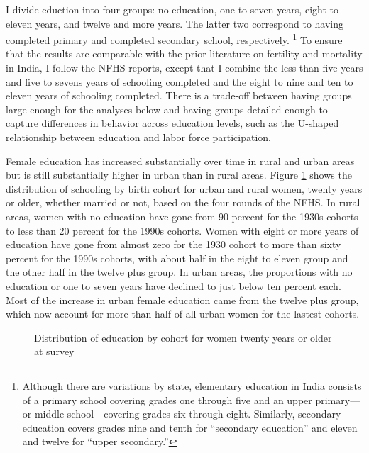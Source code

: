 \documentclass[12pt,letterpaper]{article}
\begin{document}

I divide eduction into four groups: no education, one to seven years, eight to eleven 
years, and twelve and more years.
The latter two correspond to having completed primary and completed secondary school, 
respectively.%
\footnote{
Although there are variations by state, elementary education in India consists of a 
primary school covering grades one through five and an upper primary---or middle 
school---covering grades six through eight. 
Similarly, secondary education covers grades nine and tenth for ``secondary education'' 
and eleven and twelve for ``upper secondary.''
}
To ensure that the results are comparable with the prior literature on fertility
and mortality in India, I follow the NFHS reports, except that I combine the 
less than five years and five to sevens years of schooling completed and the eight to nine 
and ten to eleven years of schooling completed.
There is a trade-off between having groups large enough for the analyses below and having 
groups detailed enough to capture differences in behavior across education levels, such as 
the U-shaped relationship between education and labor force participation.


Female education has increased substantially over time in rural and urban areas but 
is still substantially higher in urban than in rural areas.
Figure \ref{fig:education_over_time} shows the distribution of schooling by birth 
cohort for urban and rural women, 
twenty years or older, whether married or not, based on the four rounds of the NFHS.
In rural areas, women with no education have gone from 90 percent for the 1930s cohorts to 
less than 20 percent for the 1990s cohorts.
Women with eight or more years of education have gone from almost zero for the 1930 cohort 
to more than sixty percent for the 1990s cohorts, with about half in the eight to eleven 
group and the other half in the twelve plus group.
In urban areas, the proportions with no education or one to seven years have declined 
to just below ten percent each.
Most of the increase in urban female education came from the twelve plus group, which 
now account for more than half of all urban women for the lastest cohorts.

\begin{figure}[htpb]
\centering
{} 
\caption{Distribution of education by cohort for women twenty years or older at survey}
\label{fig:education_over_time}
\end{figure}
\end{document}
